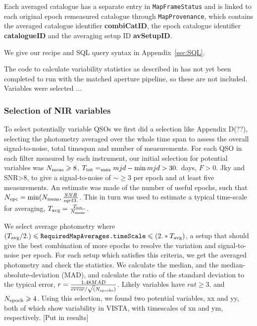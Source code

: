 \documentclass[usenatbib]{mnras}
\begin{document}
    Each averaged catalogue has a separate entry in
    \verb+MapFrameStatus+ and is linked to each original epoch remeasured catalogue
    through \verb+MapProvenance+, which contains the averaged catalogue
    identifier {\bf combiCatID}, the epoch catalogue identifier {\bf catalogueID}
    and the averaging setup ID {\bf avSetupID}. 

We give our recipe and SQL query syntax in Appendix~\ref{sec:SQL}.



    The code to calculate variability statistics as described in \cite{Cross2009} has
    not yet been completed to run with the matched aperture pipeline, so these are
    not included. Variables were selected ...
    
    
    

\subsubsection{Selection of NIR variables}
To select potentially variable QSOs we first did a selection like
Appendix D(??), selecting the photometry averaged over the whole time
span to assess the overall signal-to-noise, total timespan and number
of measurements. For each QSO in each filter measured by each
instrument, our initial selection for potential variables was $N_{\rm
meas}\geq8$, $T_{\rm tot}=\max{mjd}-\min{mjd}>30.$ days, $F>0.$ Jky
and SNR>8, to give a signal-to-noise of $\sim\geq3$ per epoch and at
least five measurements. An estimate was made of the number of useful
epochs, such that $N_{\rm epc}=\min(N_{\rm
meas},\frac{SNR}{sqrt{3.}}$. This in turn was used to estimate a
typical time-scale for averaging, $T_{\rm avg}=\frac{T_{\rm
tot}}{N_{\rm meas}}$.

We select average photometry where $(T_{\rm
avg}/2.)\leq\verb+RequiredMapAverages.timeScale+\leq(2.*T_{\rm avg})$,
a setup that should give the best combination of more epochs to
resolve the variation and signal-to-noise per epoch. For each setup
which satisfies this criteria, we get the averaged photometry and
check the statistics. We calculate the median, and the
median-absolute-deviation (MAD), and calculate the ratio of the
standard deviation to the typical error, 
$r=\frac{1.48MAD} {{\overline{error}/\sqrt(N_{\rm epochs})}}$. Likely variables have
$rat\geq3.$ and $N_{\rm epoch}\geq4$. Using this selection, we found
two potential variables, xx and yy, both of which show variability in
VISTA, with timescales of xn and ym, respectively. [Put in results]
\end{document}
